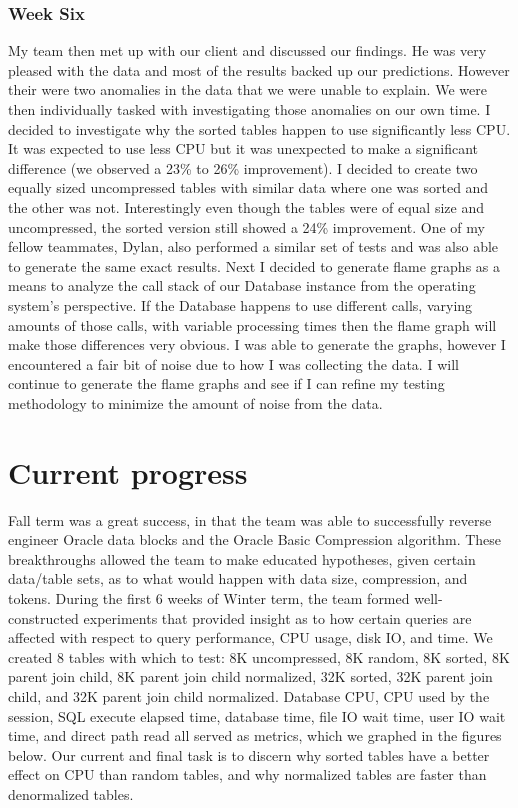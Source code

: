 \documentclass[10pt]{article}
\begin{document}
\subsubsection{Week Six}
My team then met up with our client and discussed our findings. He was very pleased with the data and most of the results backed up our predictions. However their were two anomalies in the data that we were unable to explain. We were then individually tasked with investigating those anomalies on our own time. I decided to investigate why the sorted tables happen to use significantly less CPU. It was expected to use less CPU but it was unexpected to make a significant difference (we observed a 23\% to 26\% improvement). I decided to create two equally sized uncompressed tables with similar data where one was sorted and the other was not. Interestingly even though the tables were of equal size and uncompressed, the sorted version still showed a 24\% improvement. One of my fellow teammates, Dylan, also performed a similar set of tests and was also able to generate the same exact results. Next I decided to generate flame graphs as a means to analyze the call stack of our Database instance from the operating system's perspective. If the Database happens to use different calls, varying amounts of those calls, with variable processing times then the flame graph will make those differences very obvious. I was able to generate the graphs, however I encountered a fair bit of noise due to how I was collecting the data. I will continue to generate the flame graphs and see if I can refine my testing methodology to minimize the amount of noise from the data.


\section{Current progress}
Fall term was a great success, in that the team was able to successfully reverse engineer Oracle data blocks and the Oracle Basic Compression algorithm. These breakthroughs allowed the team to make educated hypotheses, given certain data/table sets, as to what would happen with data size, compression, and tokens. During the first 6 weeks of Winter term, the team formed well-constructed experiments that provided insight as to how certain queries are affected with respect to query performance, CPU usage, disk IO, and time. We created 8 tables with which to test: 8K uncompressed, 8K random, 8K sorted, 8K parent join child, 8K parent join child normalized, 32K sorted, 32K parent join child, and 32K parent join child normalized. Database CPU, CPU used by the session, SQL execute elapsed time, database time, file IO wait time, user IO wait time, and direct path read all served as metrics, which we graphed in the figures below. Our current and final task is to discern why sorted tables have a better effect on CPU than random tables, and why normalized tables are faster than denormalized tables.
\end{document}
